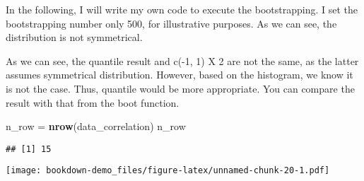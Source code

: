 \documentclass[]{book}
\newenvironment{Shaded}{\begin{snugshade}}{\end{snugshade}}
\newcommand{\CommentTok}[1]{\textcolor[rgb]{0.56,0.35,0.01}{\textit{#1}}}
\newcommand{\ControlFlowTok}[1]{\textcolor[rgb]{0.13,0.29,0.53}{\textbf{#1}}}
\newcommand{\DataTypeTok}[1]{\textcolor[rgb]{0.13,0.29,0.53}{#1}}
\newcommand{\DecValTok}[1]{\textcolor[rgb]{0.00,0.00,0.81}{#1}}
\newcommand{\FloatTok}[1]{\textcolor[rgb]{0.00,0.00,0.81}{#1}}
\newcommand{\KeywordTok}[1]{\textcolor[rgb]{0.13,0.29,0.53}{\textbf{#1}}}
\newcommand{\NormalTok}[1]{#1}
\newcommand{\OperatorTok}[1]{\textcolor[rgb]{0.81,0.36,0.00}{\textbf{#1}}}
\newcommand{\OtherTok}[1]{\textcolor[rgb]{0.56,0.35,0.01}{#1}}
\newcommand{\StringTok}[1]{\textcolor[rgb]{0.31,0.60,0.02}{#1}}
\begin{document}
In the following, I will write my own code to execute the bootstrapping. I set the bootstrapping number only 500, for illustrative purposes. As we can see, the distribution is not symmetrical.

As we can see, the quantile result and c(-1, 1) X 2 are not the same, as the latter assumes symmetrical distribution. However, based on the histogram, we know it is not the case. Thus, quantile would be more appropriate. You can compare the result with that from the boot function.

\begin{Shaded}
\begin{Highlighting}[]
\NormalTok{n_row =}\StringTok{ }\KeywordTok{nrow}\NormalTok{(data_correlation)}
\NormalTok{n_row}
\end{Highlighting}
\end{Shaded}

\begin{verbatim}
## [1] 15
\end{verbatim}

\begin{Shaded}
\end{Shaded}

\texttt{[image: bookdown-demo\_files/figure-latex/unnamed-chunk-20-1.pdf]}

\begin{Shaded}
\end{Shaded}
\end{document}
